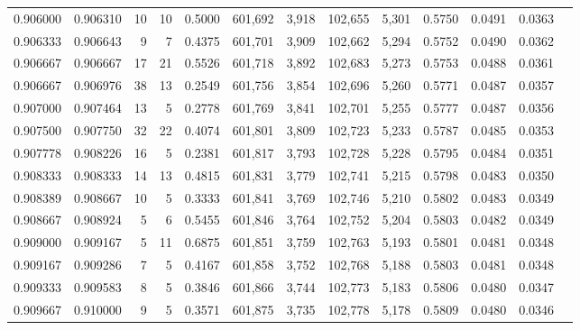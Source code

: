 \begin{tabular}{rrrrrrrrrrrrr}
0.906000 & 0.906310 &    10 &  10 &                                     0.5000 & 601,692 &   3,918 & 102,655 &   5,301 & 0.5750 & 0.0491 & 0.0363 \\
0.906333 & 0.906643 &     9 &   7 &                                     0.4375 & 601,701 &   3,909 & 102,662 &   5,294 & 0.5752 & 0.0490 & 0.0362 \\
0.906667 & 0.906667 &    17 &  21 &                                     0.5526 & 601,718 &   3,892 & 102,683 &   5,273 & 0.5753 & 0.0488 & 0.0361 \\
0.906667 & 0.906976 &    38 &  13 &                                     0.2549 & 601,756 &   3,854 & 102,696 &   5,260 & 0.5771 & 0.0487 & 0.0357 \\
0.907000 & 0.907464 &    13 &   5 &                                     0.2778 & 601,769 &   3,841 & 102,701 &   5,255 & 0.5777 & 0.0487 & 0.0356 \\
0.907500 & 0.907750 &    32 &  22 &                                     0.4074 & 601,801 &   3,809 & 102,723 &   5,233 & 0.5787 & 0.0485 & 0.0353 \\
0.907778 & 0.908226 &    16 &   5 &                                     0.2381 & 601,817 &   3,793 & 102,728 &   5,228 & 0.5795 & 0.0484 & 0.0351 \\
0.908333 & 0.908333 &    14 &  13 &                                     0.4815 & 601,831 &   3,779 & 102,741 &   5,215 & 0.5798 & 0.0483 & 0.0350 \\
0.908389 & 0.908667 &    10 &   5 &                                     0.3333 & 601,841 &   3,769 & 102,746 &   5,210 & 0.5802 & 0.0483 & 0.0349 \\
0.908667 & 0.908924 &     5 &   6 &                                     0.5455 & 601,846 &   3,764 & 102,752 &   5,204 & 0.5803 & 0.0482 & 0.0349 \\
0.909000 & 0.909167 &     5 &  11 &                                     0.6875 & 601,851 &   3,759 & 102,763 &   5,193 & 0.5801 & 0.0481 & 0.0348 \\
0.909167 & 0.909286 &     7 &   5 &                                     0.4167 & 601,858 &   3,752 & 102,768 &   5,188 & 0.5803 & 0.0481 & 0.0348 \\
0.909333 & 0.909583 &     8 &   5 &                                     0.3846 & 601,866 &   3,744 & 102,773 &   5,183 & 0.5806 & 0.0480 & 0.0347 \\
0.909667 & 0.910000 &     9 &   5 &                                     0.3571 & 601,875 &   3,735 & 102,778 &   5,178 & 0.5809 & 0.0480 & 0.0346 \\

\end{tabular}
